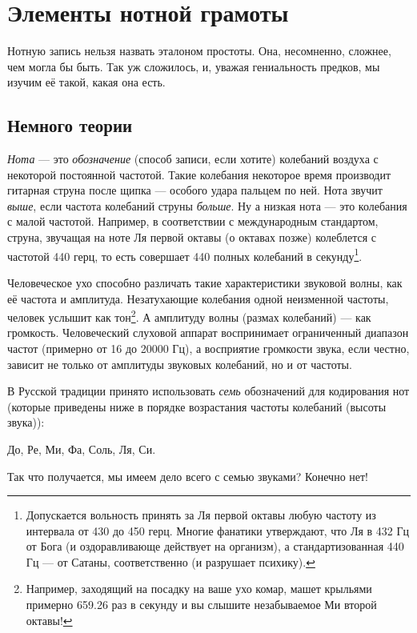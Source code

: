 \chapter{Элементы нотной грамоты}
\label{ch:note}

Нотную запись нельзя назвать эталоном простоты. Она, несомненно, сложнее, чем могла бы быть. Так уж сложилось, и, уважая гениальность предков, мы изучим её такой, какая она есть.


\section{Немного теории}

\emph{Нота} --- это \emph{обозначение} (способ записи, если хотите) колебаний воздуха с некоторой постоянной частотой. Такие колебания некоторое время производит гитарная струна после щипка --- особого удара пальцем по ней. Нота звучит \emph{выше}, если частота колебаний струны \emph{больше}. Ну а низкая нота --- это колебания с малой частотой. Например, в соответствии с международным стандартом, струна, звучащая на ноте Ля первой октавы (о октавах позже) колеблется с частотой 440 герц, то есть совершает 440 полных колебаний в секунду\footnote{Допускается вольность принять за Ля первой октавы любую частоту из интервала от 430 до 450 герц. Многие фанатики утверждают, что Ля в 432 Гц от Бога (и оздоравливающе действует на организм), а стандартизованная 440 Гц --- от Сатаны, соответственно (и разрушает психику).}.

Человеческое ухо способно различать такие характеристики звуковой волны, как её частота и амплитуда. Незатухающие колебания одной неизменной частоты, человек услышит как тон\footnote{Например, заходящий на посадку на ваше ухо комар, машет крыльями примерно 659.26 раз в секунду и вы слышите незабываемое Ми второй октавы!}. А амплитуду волны (размах колебаний) --- как громкость. Человеческий слуховой аппарат воспринимает ограниченный диапазон частот (примерно от 16 до 20000 Гц), а восприятие громкости звука, если честно, зависит не только от амплитуды звуковых колебаний, но и от частоты.

В Русской традиции принято использовать \emph{семь} обозначений для кодирования нот (которые приведены ниже в порядке возрастания частоты колебаний (высоты звука)): 
\begin{center}
    До, Ре, Ми, Фа, Соль, Ля, Си. 
\end{center}

Так что получается, мы имеем дело всего с семью звуками? Конечно нет!

